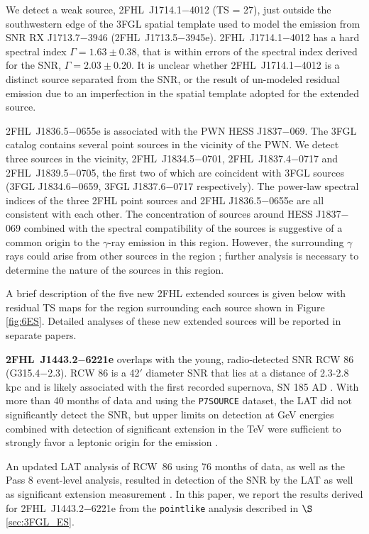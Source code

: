 We detect a weak source, 2FHL~J1714.1$-$4012 (TS = 27), just outside the southwestern edge of the 3FGL spatial template used to model the emission from SNR RX J1713.7$-$3946 (2FHL~J1713.5$-$3945e). 2FHL~J1714.1$-$4012 has a hard spectral index $\Gamma = 1.63 \pm 0.38$, that is within errors of the spectral index derived for the SNR, $\Gamma = 2.03 \pm 0.20$. It is unclear whether 2FHL~J1714.1$-$4012 is a distinct source separated from the SNR, or the result of un-modeled residual emission due to an imperfection in the spatial template adopted for the extended source.


2FHL~J1836.5$-$0655e is associated with the PWN HESS J1837$-$069. The 3FGL catalog contains  several point sources in the vicinity of the PWN. We detect three sources in the vicinity, 2FHL~J1834.5$-$0701, 2FHL~J1837.4$-$0717 and 2FHL~J1839.5$-$0705, the first two of which are coincident with 3FGL sources (3FGL J1834.6$-$0659, 3FGL J1837.6$-$0717 respectively). The power-law spectral indices of the three 2FHL point sources and 2FHL J1836.5$-$0655e are all consistent with each other. The concentration of sources around HESS J1837$-$069 combined with the spectral compatibility of the sources is suggestive of a common origin to the $\gamma$-ray emission in this region. However, the surrounding $\gamma$ rays could arise from other sources in the region \citep{Gotthelf08}; further analysis is necessary to determine the nature of the sources in this region. 

A brief description of the five new 2FHL extended sources is given below with residual TS maps for the region surrounding each source shown in Figure \ref{fig:6ES}. Detailed analyses of these new extended sources will be reported in separate papers.


{\bfseries 2FHL~J1443.2$-$6221e} overlaps with the young, radio-detected SNR RCW 86 (G315.4−2.3). RCW 86 is a 42$'$ diameter SNR that lies at a distance of 2.3-2.8 kpc and is likely associated with the first recorded supernova, SN 185 AD \citep{Rosado96,Sollerman03}. With more than 40 months of data and using the {\tt P7SOURCE} dataset, the LAT did not significantly detect the SNR, but upper limits on detection at GeV energies combined with detection of significant extension in the TeV \citep{Aharonian09} were sufficient to strongly favor a leptonic origin for the emission \citep{Lemoine-Goumard12}.

An updated LAT analysis of RCW~86 using 76 months of data, as well as the Pass 8 event-level analysis, resulted in detection of the SNR by the LAT as well as significant extension measurement \citep{Hewitt15}. In this paper, we report the results derived for 2FHL~J1443.2$-$6221e from the {\tt pointlike} analysis described in $\S$ \ref{sec:3FGL_ES}.


